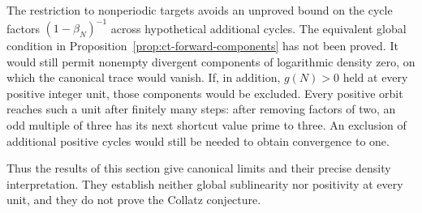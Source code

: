 The restriction to nonperiodic targets avoids an unproved bound
on the cycle factors \((1-\beta_N)^{-1}\) across hypothetical
additional cycles. The equivalent global condition in
Proposition~\ref{prop:ct-forward-components} has not been proved.
It would still permit nonempty divergent components of logarithmic
density zero, on which the canonical trace would vanish.
If, in addition, \(g(N)>0\) held at every positive integer unit,
those components would be excluded. Every positive orbit reaches
such a unit after finitely many steps: after removing factors of two,
an odd multiple of three has its next shortcut value prime to three.
An exclusion of additional positive cycles would still be needed
to obtain convergence to one.

Thus the results of this section give canonical limits and their
precise density interpretation. They establish neither global
sublinearity nor positivity at every unit, and they do not prove
the Collatz conjecture.
